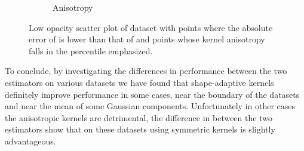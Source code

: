 \begin{figure}
\begin{subfigure}{0.23\textwidth}
				\caption{Anisotropy}
				\label{fig:discussion:ferdosi3Noise:anisotropy}
			\end{subfigure}			
			\caption{Low opacity scatter plot of dataset \ferdosiThreeNoise with %
				 points where the absolute error of \mbe is lower than that of \sambe and %
				 points whose kernel anisotropy falls in the  percentile emphasized.}
			\label{fig:discussion:ferdosi3Noise}
		\end{figure}		

To conclude, by investigating the differences in performance between the two estimators on various datasets we have found that shape-adaptive kernels definitely improve performance in some cases, \eg near the boundary of the datasets and near the mean of some Gaussian components. Unfortunately in other cases the anisotropic kernels are detrimental, the difference in \mse between the two estimators show that on these datasets using symmetric kernels is slightly advantageous. 